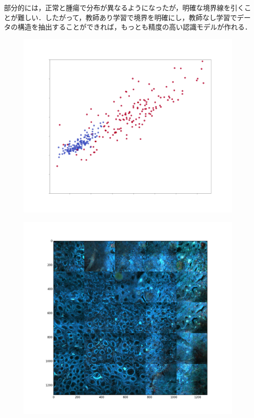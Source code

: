部分的には，正常と腫瘍で分布が異なるようになったが，明確な境界線を引くことが難しい．したがって，教師あり学習で境界を明確にし，教師なし学習でデータの構造を抽出することができれば，もっとも精度の高い認識モデルが作れる．

\begin{figure}[H]
	\centering
	
	\begin{minipage}[b]{0.45\columnwidth}
		\centering
		\includegraphics[width=\linewidth]{fig/chapter4/vae_latent_vectors}
		\label{fig:vaelatentvectors}
	\end{minipage}
	\hspace{5truemm}
	\begin{minipage}[b]{0.45\columnwidth}
		\centering
		\includegraphics[width=\linewidth]{fig/chapter4/vae_result_picture}
		\label{fig:vaeresultpicture}
	\end{minipage}


\end{figure}
